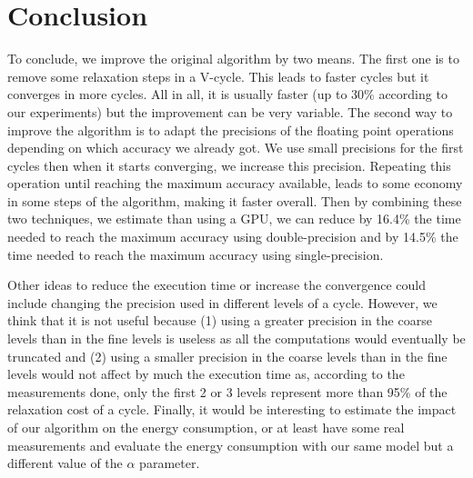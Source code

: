 \section{Conclusion}
\label{sec:conclusions}

To conclude, we improve the original algorithm by two means. The first one is to remove some relaxation steps in a V-cycle. This leads to faster cycles but it converges in more cycles. All in all,
   it is usually faster (up to 30\% according to our experiments) but the improvement can be very variable. The second way to improve the algorithm is to adapt the precisions of the floating point
   operations depending on which accuracy we already got. We use small precisions for the first cycles then when it starts converging, we increase this precision. Repeating this operation until reaching the maximum accuracy available, leads
   to some economy in some steps of the algorithm, making it faster overall. Then by combining these two techniques, we estimate than using a GPU, we can reduce by 16.4\% the time needed to reach the maximum accuracy using double-precision and by 14.5\% the time needed
   to reach the maximum accuracy using single-precision.

   Other ideas to reduce the execution time or increase the convergence could include changing the precision used in different levels of a cycle. However, we think that it is not
   useful because (1) using a greater precision in the coarse levels than in the fine levels is useless as all the computations would eventually be truncated and (2) using a smaller
   precision in the coarse levels than in the fine levels would not affect by much the execution time as, according to the measurements done, only the first 2 or 3 levels represent more than 95\% of the relaxation cost of a cycle.
   Finally, it would be interesting to estimate the impact of our algorithm on the energy consumption, or at least have some real measurements and evaluate the energy consumption with our
   same model but a different value of the $\alpha$ parameter.

